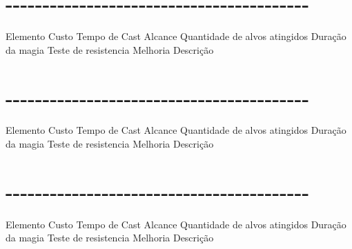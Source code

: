 \documentclass{article}%
\begin{document}
%
\section{{-}{-}{-}{-}{-}{-}{-}{-}{-}{-}{-}{-}{-}{-}{-}{-}{-}{-}{-}{-}{-}{-}{-}{-}{-}{-}{-}{-}{-}{-}{-}{-}{-}{-}{-}{-}{-}{-}{-}{-}{-}}%
\label{sec:{-}{-}{-}{-}{-}{-}{-}{-}{-}{-}{-}{-}{-}{-}{-}{-}{-}{-}{-}{-}{-}{-}{-}{-}{-}{-}{-}{-}{-}{-}{-}{-}{-}{-}{-}{-}{-}{-}{-}{-}{-}}%
Elemento \newline%
Custo \newline%
Tempo de Cast \newline%
Alcance \newline%
Quantidade de alvos atingidos \newline%
Duração da magia \newline%
Teste de resistencia \newline%
Melhoria \newline%
Descrição \newline%

%
\section{{-}{-}{-}{-}{-}{-}{-}{-}{-}{-}{-}{-}{-}{-}{-}{-}{-}{-}{-}{-}{-}{-}{-}{-}{-}{-}{-}{-}{-}{-}{-}{-}{-}{-}{-}{-}{-}{-}{-}{-}{-}}%
\label{sec:{-}{-}{-}{-}{-}{-}{-}{-}{-}{-}{-}{-}{-}{-}{-}{-}{-}{-}{-}{-}{-}{-}{-}{-}{-}{-}{-}{-}{-}{-}{-}{-}{-}{-}{-}{-}{-}{-}{-}{-}{-}}%
Elemento \newline%
Custo \newline%
Tempo de Cast \newline%
Alcance \newline%
Quantidade de alvos atingidos \newline%
Duração da magia \newline%
Teste de resistencia \newline%
Melhoria \newline%
Descrição \newline%

%
\section{{-}{-}{-}{-}{-}{-}{-}{-}{-}{-}{-}{-}{-}{-}{-}{-}{-}{-}{-}{-}{-}{-}{-}{-}{-}{-}{-}{-}{-}{-}{-}{-}{-}{-}{-}{-}{-}{-}{-}{-}{-}}%
\label{sec:{-}{-}{-}{-}{-}{-}{-}{-}{-}{-}{-}{-}{-}{-}{-}{-}{-}{-}{-}{-}{-}{-}{-}{-}{-}{-}{-}{-}{-}{-}{-}{-}{-}{-}{-}{-}{-}{-}{-}{-}{-}}%
Elemento \newline%
Custo \newline%
Tempo de Cast \newline%
Alcance \newline%
Quantidade de alvos atingidos \newline%
Duração da magia \newline%
Teste de resistencia \newline%
Melhoria \newline%
Descrição \newline%
\end{document}
